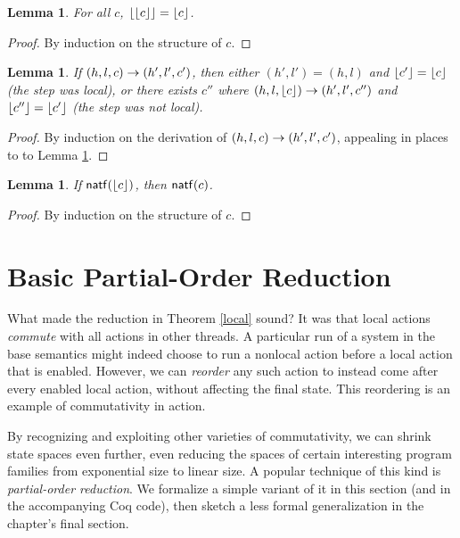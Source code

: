 \documentclass{amsbook}
\newtheorem{lemma}[theorem]{Lemma}
\theoremstyle{definition}
\theoremstyle{remark}
\numberwithin{section}{chapter}
\numberwithin{equation}{chapter}
\begin{document}
\begin{lemma}\label{rl_idem}
  For all $c$, ${\left \lfloor {\left \lfloor c \right \rfloor} \right \rfloor} = {\left \lfloor c \right \rfloor}$.
\end{lemma}
\begin{proof}
  By induction on the structure of $c$.
\end{proof}

\begin{lemma}
  If $(h, l, c) \to (h', l', c')$, then either $(h', l') = (h, l)$ and ${\left \lfloor c' \right \rfloor} = {\left \lfloor c \right \rfloor}$ (the step was local), or there exists $c''$ where $(h, l, {\left \lfloor c \right \rfloor}) \to (h', l', c'')$ and ${\left \lfloor c'' \right \rfloor} = {\left \lfloor c' \right \rfloor}$ (the step was not local).
\end{lemma}
\begin{proof}
  By induction on the derivation of $(h, l, c) \to (h', l', c')$, appealing in places to to Lemma \ref{rl_idem}.
\end{proof}

\begin{lemma}
  If $\mathsf{natf}({\left \lfloor c \right \rfloor})$, then $\mathsf{natf}(c)$.
\end{lemma}
\begin{proof}
  By induction on the structure of $c$.
\end{proof}


\section{Basic Partial-Order Reduction}

What made the reduction in Theorem \ref{local} sound?
It was that local actions \emph{commute} with all actions in other threads.
A particular run of a system in the base semantics might indeed choose to run a nonlocal action before a local action that is enabled.
However, we can \emph{reorder} any such action to instead come after every enabled local action, without affecting the final state.
This reordering is an example of commutativity in action.

By recognizing and exploiting other varieties of commutativity, we can shrink state spaces even further, even reducing the spaces of certain interesting program families from exponential size to linear size.
A popular technique of this kind is \emph{partial-order reduction}.
We formalize a simple variant of it in this section (and in the accompanying Coq code), then sketch a less formal generalization in the chapter's final section.

\newcommand{\summ}[2]{\mt{summarize}(#1, #2)}
\end{document}
